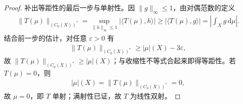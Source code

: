 \documentclass[../../main.tex]{subfiles}%
\begin{document}
\begin{proof}
补出等距性的最后一步与单射性。因 $\|g\|_\infty\leqslant1$，由对偶范数的定义
\begin{align*}
\|T(\mu)\|_{(C_0(X))^*}=\sup_{\|h\|_\infty\leqslant1}|\langle T(\mu),h\rangle|\geqslant|\langle T(\mu),g\rangle|=\left|\int_Xg\,\mathrm{d}\mu\right|.
\end{align*}
结合前一步的估计，对任意 $\varepsilon>0$ 有
\begin{align*}
\|T(\mu)\|_{(C_0(X))^*}\geqslant|\mu|(X)-3\varepsilon,
\end{align*}
故 $\|T(\mu)\|_{(C_0(X))^*}\geqslant|\mu|(X)$；与收缩性不等式合起来即得等距性。若 $T(\mu)=0$，则
\begin{align*}
|\mu|(X)=\|T(\mu)\|_{(C_0(X))^*}=0,
\end{align*}
故 $\mu=0$，即 $T$ 单射；满射性已证，故 $T$ 为线性双射。
\end{proof}
\end{document}
